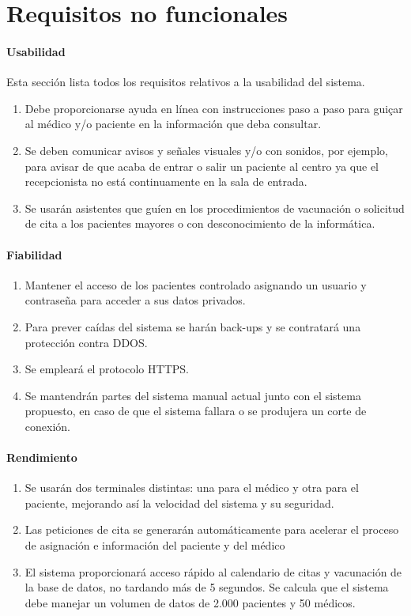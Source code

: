 \documentclass[12pt, spanish]{article}
\begin{document}
\clearpage
\section{Requisitos no funcionales}

\paragraph{Usabilidad}
Esta sección lista todos los requisitos relativos a la usabilidad del sistema.
\begin{enumerate}[start =1, label={\bfseries RN-\arabic*.}]
  \item Debe proporcionarse ayuda en línea con instrucciones paso a paso para guiçar al médico y/o paciente en la información que deba consultar.
  \item Se deben comunicar avisos y señales visuales y/o con sonidos, por ejemplo, para avisar de que acaba de entrar o salir un paciente al centro ya que el recepcionista no está continuamente en la sala de entrada.
  \item Se usarán asistentes que guíen en los procedimientos de vacunación o solicitud de cita a los pacientes mayores o con desconocimiento de la informática.
\end{enumerate}

\paragraph{Fiabilidad}
\begin{enumerate}[resume*]
  \item Mantener el acceso de los pacientes controlado asignando un usuario y contraseña para acceder a sus datos privados. 
  \item Para prever caídas del sistema se harán back-ups y se contratará una protección contra DDOS.
  \item Se empleará el protocolo HTTPS.
  \item Se mantendrán partes del sistema manual actual junto con el sistema propuesto, en caso de que el sistema fallara o se produjera un corte de conexión.
\end{enumerate}

\paragraph{Rendimiento}
\begin{enumerate}[resume*]
  \item Se usarán dos terminales distintas: una para el médico y otra para el paciente, mejorando así la velocidad del sistema y su seguridad.
  \item Las peticiones de cita se generarán automáticamente para acelerar el proceso de asignación e información del paciente y del médico
  \item El sistema proporcionará acceso rápido al calendario de citas y vacunación de la base de datos, no tardando más de 5 segundos. Se calcula que el sistema debe manejar un volumen de datos de 2.000 pacientes y 50 médicos.
\end{enumerate} 
\end{document}

